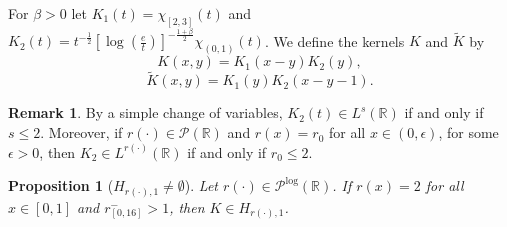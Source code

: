 \documentclass[a4paper,11pt,reqno]{amsart}
\theoremstyle{plain}
\numberwithin{equation}{section}
\newtheorem{propo}[teo]{Proposition}
\theoremstyle{definition}
\newtheorem{remark}[teo]{Remark}
\begin{document}
For $\beta>0$ let $K_1(t)=\chi_{[2,3]}(t)$ and $K_2(t)=t^{-\frac{1}{2}}\left[\log\left(\frac{e}{t}\right)\right]^{-\frac{1+\beta}{2}}\chi_{(0,1)}(t)$. We define the kernels $K$ and $\tilde{K}$ by
$$K(x,y)=K_1(x-y)K_2(y),$$
\begin{equation}\label{K tilde}
	\tilde{K}(x,y)=K_1(y)K_2(x-y-1).
\end{equation}
\begin{remark}\label{norma de K2} By a simple change of variables, $K_2(t)\in L^s(\mathbb{R})$ if and only if $s\leq 2$. Moreover, if ${r(\cdot)}\in \mathcal{P}(\mathbb{R})$ and $r(x)= r_0$ for all $x\in (0,\epsilon)$, for some $\epsilon>0$, then 
	$K_2\in L^{r(\cdot)}(\mathbb{R})$ if and only if $r_0\leq 2$.
\end{remark}
\begin{propo} [$H_{r(\cdot),1}\neq\emptyset$]\label{ejemplo de núcleo en Hr1}
	Let $r(\cdot)\in \mathcal{P}^{\log}(\mathbb{R})$. If $r(x)=2$ for all $x\in\left[0,1\right]$ and $r^-_{[0,16]}>1$, then $K\in H_{{r(\cdot)},1}$.
\end{propo}
\end{document}

